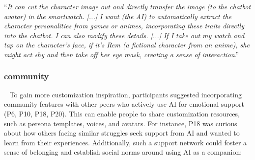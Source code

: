 ``\textit{It can cut the character image out and directly transfer the image (to the chatbot avatar) in the smartwatch. [...] I want (the AI) to automatically extract the character personalities from games or animes, incorporating these traits directly into the chatbot. I can also modify these details. [...] If I take out my watch and tap on the character's face, if it's Rem (a fictional character from an anime), she might act shy and then take off her eye mask, creating a sense of interaction}.'' 





\subsubsection{ community }~\label{community}
To gain more customization inspiration, participants suggested incorporating community features with other peers who actively use AI for emotional support (P6, P10, P18, P20). This can enable people to share customization resources, such as persona templates, voices, and avatars. For instance, P18 was curious about how others facing similar struggles seek support from AI and wanted to learn from their experiences. Additionally, such a support network could foster a sense of belonging and establish social norms around using AI as a companion:

